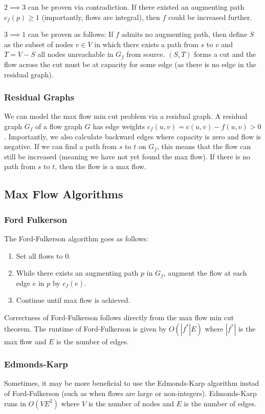 \documentclass[10pt]{article}
\begin{document}
$2 \implies 3$ can be proven via contradiction. If there existed an augmenting path $c_f(p) \geq 1$ (importantly, flows are integral), then $f$ could be increased further.

$3 \implies 1$ can be proven as follows: If $f$ admits no augmenting path, then define $S$ as the subset of nodes $v \in V$ in which there exists a path from $s$ to $v$ and $T = V-S$ all nodes unreachable in $G_f$ from source. $(S, T)$ forms a cut and the flow across the cut must be at capacity for some edge (as there is no edge in the residual graph).

\subsubsection*{Residual Graphs}
We can model the max flow min cut problem via a residual graph. A residual graph $G_f$ of a flow graph $G$ has edge weights $c_f(u, v) = c(u, v) - f(u, v) > 0$. Importantly, we also calculate backward edges where capacity is zero and flow is negative. If we can find a path from $s$ to $t$ on $G_f$, this means that the flow can still be increased (meaning we have not yet found the max flow). If there is no path from $s$ to $t$, then the flow is a max flow.
\subsection*{Max Flow Algorithms}
\subsubsection*{Ford Fulkerson}
The Ford-Fulkerson algorithm goes as follows:
\begin{enumerate}
    \item Set all flows to 0.
    \item While there exists an augmenting path $p$ in $G_f$, augment the flow at each edge $e$ in $p$ by $c_f(e)$.
    \item Continue until max flow is achieved.
\end{enumerate}
Correctness of Ford-Fulkerson follows directly from the max flow min cut theorem. The runtime of Ford-Fulkerson is given by $O(|f^*|E)$ where $|f^*|$ is the max flow and $E$ is the number of edges.
\subsubsection*{Edmonds-Karp}
Sometimes, it may be more beneficial to use the Edmonds-Karp algorithm instad of Ford-Fulkerson (such as when flows are large or non-integers). Edmonds-Karp runs in $O(VE^2)$ where $V$ is the number of nodes and $E$ is the number of edges.
\end{document}
